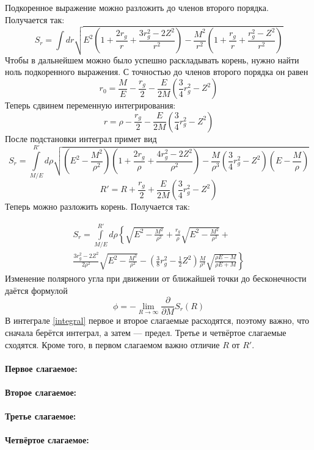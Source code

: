 \documentclass{article}
\begin{document}
Подкоренное выражение можно разложить до членов второго порядка. Получается
так:
\begin{equation}
S_r = \int {d} r\sqrt{
		E^2\left(1 + \frac{2r_g}{r} + \frac{3r_{g}^{2} - 2Z^2}{r^2}\right)
		-\frac{M^2}{r^2}\left(1 + \frac{r_g}{r} + \frac{r_g^2 - Z^2}{r^2}\right)
	}
\end{equation}
Чтобы в дальнейшем можно было успешно раскладывать корень, нужно найти ноль подкоренного
выражения. С точностью до членов второго порядка он равен
\begin{equation}
r_0 = \frac{M}{E} - \frac{r_g}{2} - \frac{E}{2M}\left(\frac{3}{4}r_g^2 - Z^2\right)
\end{equation}
Теперь сдвинем переменную интегрирования:
\begin{equation}
	r = \rho - \frac{r_g}{2} - \frac{E}{2M}\left(\frac{3}{4}r_g^2 - Z^2\right)
\end{equation}
После подстановки интеграл примет вид 
\begin{equation}
S_r = \int\limits_{M/E}^{R'}%
		d\rho \sqrt{
		\left(E^2 - \frac{M^2}{\rho^2}\right)
			\left(1 + \frac{2r_g}{\rho} + \frac{4r_g^2 - 2Z^2}{\rho^2}\right)
		-\frac{M}{\rho^3}\left( \frac{3}{4}r_g^2 - Z^2\right) \left(E - \frac{M}{\rho}\right)
	}
\end{equation}
\begin{equation}
	R' = R + \frac{r_g}{2} +\frac{E}{2M}\left(\frac{3}{4}r_g^2 - Z^2\right) 
\end{equation}
Теперь можно разложить корень. Получается так:

\begin{multline}
\label{integral}
S_r = \int\limits_{M/E}^{R'}
		d\rho \left\{ 
		\sqrt{E^2-\frac{M^2}{\rho^2}} + \frac{r_g}{\rho} 
						\sqrt{E^2-\frac{M^2}{\rho^2}}+\right. \\ 
			\left. \frac{3r_g^2 - 2Z^2}{2\rho^2}	\sqrt{E^2-\frac{M^2}{\rho^2}} - 
			\left( \frac{3}{8} r_g^2 - \frac{1}{2}Z^2\right) \frac{M}{\rho^3} 
						\sqrt{\frac{\rho E - M}{\rho E + M}}
		\right\} 
\end{multline}
Изменение полярного угла при движении от ближайшей точки до бесконечности даётся формулой
\begin{equation}
\phi = -\lim_{R \to \infty}\frac{\partial}{\partial M} S_r(R)
\end{equation}
В интеграле \ref{integral} первое и второе слагаемые расходятся, поэтому
важно, что сначала берётся интеграл, а затем --- предел. Третье и четвёртое
слагаемые сходятся. Кроме того, в первом слагаемом важно отличие $R$ 
от $R'$.
\paragraph{Первое слагаемое:}
\paragraph{Второе слагаемое:}
\paragraph{Третье слагаемое:}

\paragraph{Четвёртое слагаемое:}
\end{document}
